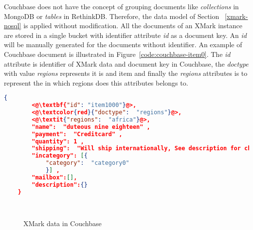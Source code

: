 Couchbase does not have the concept of grouping documents like \textit{collections} in MongoDB  or \textit{tables} in RethinkDB. 
Therefore, the data model of Section ~\ref{xmark-nosql} is applied without modification.
 All the documents of an XMark instance  are stored in a single bucket with identifier attribute \textit{id} as a document key. An \textit{id} will be manually generated for the documents without identifier.
An example of Couchbase document is illustrated in Figure~\ref{code:couchbase-item0}. The \textit{id} attribute is identifier of XMark data and document key in Couchbase, the \textit{doctype} with  value \textit{regions} represents it is and item and finally the \textit{regions} attributes is to represent the in which regions does this attributes belongs to.

\newbox\cbXmarkDocument
\begin{lrbox}{\cbXmarkDocument}
\begin{lstlisting}[language=JSON,  basicstyle =\scriptsize]
    {
    	<@\textbf{"id": "item1000"}@>,
    	<@\textcolor{red}{"doctype":  "regions"}@>,
    	<@\textit{"regions":  "africa"}@>,
    	"name":  "duteous nine eighteen" ,
    	"payment":  "Creditcard" ,
    	"quantity": 1 ,
    	"shipping":  "Will ship internationally, See description for charges" ,
    	"incategory": [{
    		"category":  "category0"
    		}] ,
    	"mailbox":[],
    	"description":{}
    }
\end{lstlisting} 
\end{lrbox}


\newbox\cbXmarkChart
\begin{lrbox}{\cbXmarkChart}
\end{lrbox}

\begin{figure}[hbtp]
\centering
{}
\\
\centering
{}

\caption{XMark data in Couchbase}
\label{xmark-cb-figure}
\end{figure}